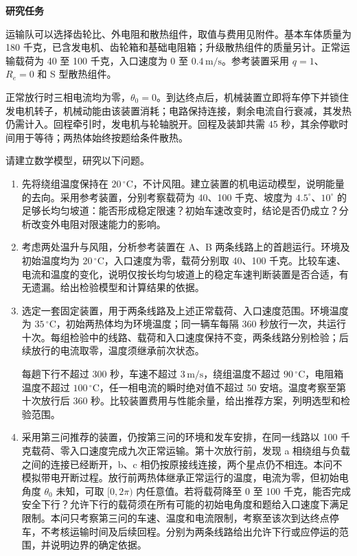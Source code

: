 \documentclass[11pt,a4paper]{article}
\begin{document}
\newpage
\begin{center}{\large\bfseries 研究任务}\end{center}

运输队可以选择齿轮比、外电阻和散热组件，取值与费用见附件。基本车体质量为 180 千克，已含发电机、齿轮箱和基础电阻箱；升级散热组件的质量另计。正常运输载荷为 40 至 100 千克，入口速度为 0 至 $0.4\,\mathrm{m/s}$。参考装置采用 $q=1$、$R_e=0$ 和 S 型散热组件。

正常放行时三相电流均为零，$\theta_0=0$。到达终点后，机械装置立即将车停下并锁住发电机转子，机械动能由该装置消耗；电路保持连接，剩余电流自行衰减，其发热仍需计入。回程牵引时，发电机与轮轴脱开。回程及装卸共需 45 秒，其余停歇时间用于等待；两热体始终按题给条件散热。

请建立数学模型，研究以下问题。
\begin{enumerate}
\item 先将绕组温度保持在 $20\,{}^\circ\mathrm C$，不计风阻。建立装置的机电运动模型，说明能量的去向。采用参考装置，分别考察载荷为 40、100 千克、坡度为 $4.5^\circ$、$10^\circ$ 的足够长均匀坡道：能否形成稳定限速？初始车速改变时，结论是否仍成立？分析改变外电阻对限速能力的影响。
\item 考虑两处温升与风阻，分析参考装置在 A、B 两条线路上的首趟运行。环境及初始温度均为 $20\,{}^\circ\mathrm C$，入口速度为零，载荷分别取 40、100 千克。比较车速、电流和温度的变化，说明仅按长均匀坡道上的稳定车速判断装置是否合适，有无遗漏。给出检验模型和计算结果的依据。
\item 选定一套固定装置，用于两条线路及上述正常载荷、入口速度范围。环境温度为 $35\,{}^\circ\mathrm C$，初始两热体均为环境温度；同一辆车每隔 360 秒放行一次，共运行十次。每组检验中的线路、载荷和入口速度保持不变，两条线路分别检验；后续放行的电流取零，温度须继承前次状态。\par
每趟下行不超过 300 秒，车速不超过 $3\,\mathrm{m/s}$，绕组温度不超过 $90\,{}^\circ\mathrm C$，电阻箱温度不超过 $100\,{}^\circ\mathrm C$，任一相电流的瞬时绝对值不超过 50 安培。温度考察至第十次放行后 360 秒。比较装置费用与性能余量，给出推荐方案，列明选型和检验范围。
\item 采用第三问推荐的装置，仍按第三问的环境和发车安排，在同一线路以 100 千克载荷、零入口速度完成九次正常运输。第十次放行前，发现 a 相绕组与负载之间的连接已经断开，b、c 相仍按原接线连接，两个星点仍不相连。本问不模拟带电开断过程。放行前两热体继承正常运行的温度，电流为零，但初始电角度 $\theta_0$ 未知，可取 $[0,2\pi)$ 内任意值。若将载荷降至 0 至 100 千克，能否完成安全下行？允许下行的载荷须在所有可能的初始电角度和题给入口速度下满足限制。本问只考察第三问的车速、温度和电流限制，考察至该次到达终点停车，不考核运输时间及后续回程。分别为两条线路给出允许下行或应停运的范围，并说明边界的确定依据。
\end{enumerate}
\end{document}
